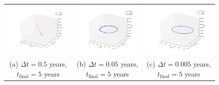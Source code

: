 \documentclass{article}
\begin{document}
\begin{multicols}{2}
\begin{figure}
\begin{center}
\begin{tabular}{ccc}
  	\includegraphics[width=60mm]{Images/Earth-Sun/EarthSun_orbit_05_tfinal5.png}
	& \includegraphics[width=60mm]{Images/Earth-Sun/EarthSun_orbit_005_tfinal5.png} 
	& \includegraphics[width=60mm]{Images/Earth-Sun/EarthSun_orbit_0005_tfinal5.png}\\
	(a) $\Delta t = 0.5$ years, $t_{\mathrm{final}} = 5$ years				& (b) $\Delta t = 0.05$ years, $t_{\mathrm{final}} = 5$ years  	& (c) $\Delta t = 0.005$ years, $t_{\mathrm{final}} = 5$ years\\[6pt]
	

\end{tabular}
\end{center}
\end{figure}
\end{multicols}
\end{document}
